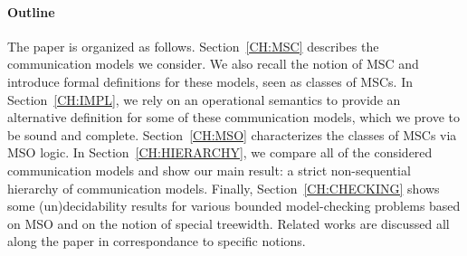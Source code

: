\paragraph{\bf Outline} The paper is organized as follows. Section~\ref{CH:MSC} describes the communication models we consider. We also recall the notion of MSC and introduce formal definitions for these models, seen as classes of MSCs.
In Section~\ref{CH:IMPL}, we rely on
an operational semantics to provide an alternative definition for some of these communication models, which we prove to be sound and complete.
Section~\ref{CH:MSO} characterizes the classes of MSCs via MSO logic.
In Section~\ref{CH:HIERARCHY}, we compare all of the considered communication models and show our main result: a strict non-sequential hierarchy of communication models.
Finally, Section~\ref{CH:CHECKING} shows some (un)decidability results for various bounded model-checking
problems based on MSO and on the notion of special treewidth. Related works are discussed all along the paper in correspondance to specific notions.


